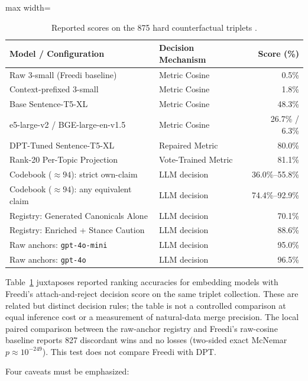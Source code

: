 \documentclass[11pt,a4paper]{article}
\begin{document}
\begin{table}[t]
\centering
\caption{Reported scores on the 875 hard counterfactual triplets \citep{blair2026embeddings}.}
\label{tab:triplets}
\small
\begin{adjustbox}{max width=\textwidth}
\begin{tabular}{@{}llr@{}}
\toprule
Model / Configuration & Decision Mechanism & Score (\%) \\
\midrule
Raw 3-small (Freedi baseline) & Metric Cosine & 0.5\% \\
Context-prefixed 3-small & Metric Cosine & 1.8\% \\
Base Sentence-T5-XL \citep{blair2026embeddings} & Metric Cosine & 48.3\% \\
e5-large-v2 / BGE-large-en-v1.5 & Metric Cosine & 26.7\% / 6.3\% \\
DPT-Tuned Sentence-T5-XL \citep{blair2026embeddings} & Repaired Metric & 80.0\% \\
Rank-20 Per-Topic Projection \citep{blair2026embeddings} & Vote-Trained Metric & 81.1\% \\
\midrule
Codebook ($\approx94$): strict own-claim & LLM decision & 36.0\%--55.8\% \\
Codebook ($\approx94$): any equivalent claim & LLM decision & 74.4\%--92.9\% \\
\midrule
Registry: Generated Canonicals Alone & LLM decision & 70.1\% \\
Registry: Enriched + Stance Caution & LLM decision & 88.6\% \\
Raw anchors: \texttt{gpt-4o-mini} & LLM decision & 95.0\% \\
Raw anchors: \texttt{gpt-4o} & LLM decision & 96.5\% \\
\bottomrule
\end{tabular}
\end{adjustbox}
\end{table}

Table~\ref{tab:triplets} juxtaposes reported ranking accuracies for embedding models with Freedi's attach-and-reject decision score on the same triplet collection. These are related but distinct decision rules; the table is not a controlled comparison at equal inference cost or a measurement of natural-data merge precision. The local paired comparison between the raw-anchor registry and Freedi's raw-cosine baseline reports 827 discordant wins and no losses (two-sided exact McNemar $p\approx 10^{-249}$). This test does not compare Freedi with DPT.

Four caveats must be emphasized:
\end{document}
